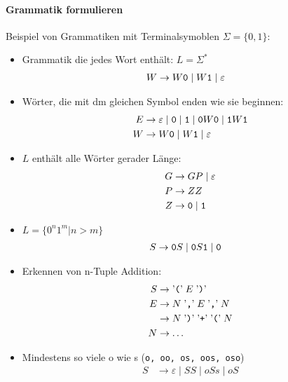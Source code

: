 \paragraph{Grammatik formulieren} Beispiel von Grammatiken mit Terminalsymoblen \(\Sigma = \{0,1\}\):
\begin{itemize}
    \item Grammatik die jedes Wort enthält: \(L = \Sigma^* \) \\
        \begin{align*}
            W&\rightarrow W{\tt 0} \mid W{\tt 1} \mid \varepsilon
        \end{align*}
    \item Wörter, die mit dm gleichen Symbol enden wie sie beginnen:
        \begin{align*}
            E&\rightarrow \varepsilon \mid {\tt 0} \mid {\tt 1} \mid  {\tt 0}W{\tt 0} \mid  {\tt 1}W{\tt 1} \\
            W&\rightarrow W{\tt 0} \mid  W{\tt 1} \mid \varepsilon
        \end{align*}
    \item \(L\) enthält alle Wörter gerader Länge:
        \begin{align*}
            G&\rightarrow GP \mid \varepsilon\\
            P&\rightarrow ZZ \\
            Z&\rightarrow {\tt 0} \mid {\tt 1}
        \end{align*}
    \item \(L = \{0^n 1^m | n > m\}\)
        \begin{align*}
            S&\rightarrow {\tt 0}S \mid {\tt 0}S{\tt 1} \mid {\tt 0}
        \end{align*}
    \item Erkennen von n-Tuple Addition:
        \begin{align*}
            S&\rightarrow \text{'{\tt (}'}\; E\; \text{'{\tt )}'}\\
            E&\rightarrow N\; \text{'{\tt ,}'}\; E\; \text{'{\tt ,}'}\; N\\
             &\rightarrow N\; \text{'{\tt )}'}\; \text{'{\tt +}'}\; \text{'{\tt (}'}\; N\\
            N&\rightarrow \dots
        \end{align*}
    \item Mindestens so viele o wie s ({\tt o, oo, os, oos, oso})
        \begin{align*}
            S &\rightarrow \varepsilon \mid SS \mid oSs \mid oS

\end{align*}
\end{itemize}
